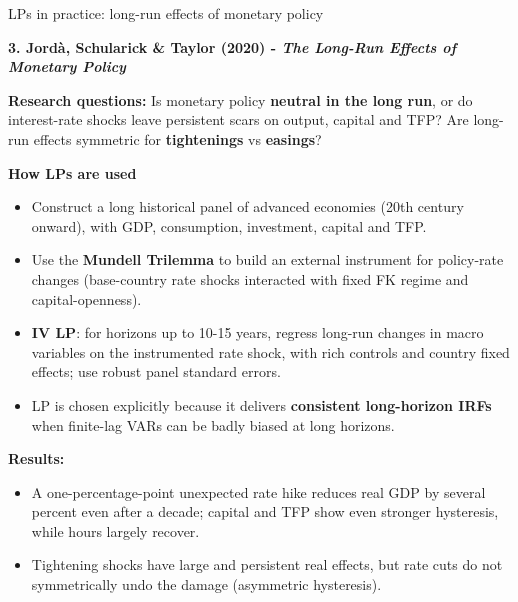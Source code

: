 \documentclass{beamer}
\begin{document}
\begin{frame}{LPs in practice: long-run effects of monetary policy}
\scriptsize

\textbf{3. Jordà, Schularick \& Taylor (2020) - \emph{The Long-Run Effects of Monetary Policy}}

\medskip
\textbf{Research questions:} Is monetary policy \textbf{neutral in the long run}, or do interest-rate
        shocks leave persistent scars on output, capital and TFP? Are long-run effects symmetric for \textbf{tightenings} vs \textbf{easings}?
        
\medskip
\textbf{How LPs are used}
\begin{itemize}
  \item Construct a long historical panel of advanced economies (20th century onward),
        with GDP, consumption, investment, capital and TFP.
  \item Use the \textbf{Mundell Trilemma} to build an external instrument for policy-rate
        changes (base-country rate shocks interacted with fixed FK regime and
        capital-openness).
  \item \textbf{IV LP}: for horizons up to 10-15 years, regress long-run changes in macro variables on the instrumented rate shock, with rich controls and country fixed effects; use robust panel standard errors.
  \item LP is chosen explicitly because it delivers \textbf{consistent long-horizon
        IRFs} when finite-lag VARs can be badly biased at long horizons.
\end{itemize}

\medskip
\textbf{Results:}
\begin{itemize}
  \item A one-percentage-point unexpected rate hike reduces real GDP by several
        percent even after a decade; capital and TFP show even stronger
        hysteresis, while hours largely recover.
  \item Tightening shocks have large and persistent real effects, but rate cuts do
        not symmetrically undo the damage (asymmetric hysteresis).
\end{itemize}

\end{frame}
\end{document}
